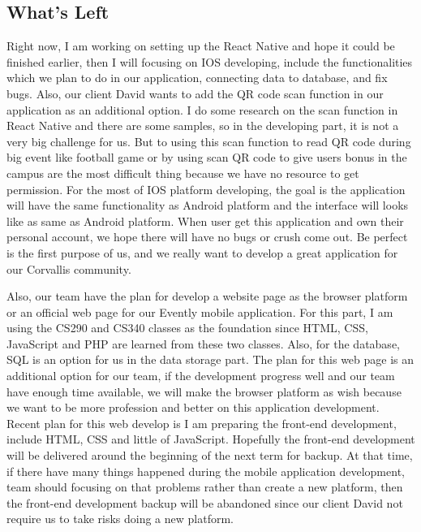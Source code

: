 \documentclass[letterpaper, 10pt,titlepage]{article}
\begin{document}
\subsection{What's Left}
Right now, I am working on setting up the React Native and hope it could be finished earlier, then I will focusing on IOS developing, include the functionalities which we plan to do in our application, connecting data to database, and fix bugs. Also, our client David wants to add the QR code scan function in our application as an additional option. I do some research on the scan function in React Native and there are some samples, so in the developing part, it is not a very big challenge for us. But to using this scan function to read QR code during big event like football game or by using scan QR code to give users bonus in the campus are the most difficult thing because we have no resource to get permission. For the most of IOS platform developing, the goal is the application will have the same functionality as Android platform and the interface will looks like as same as Android platform. When user get this application and own their personal account, we hope there will have no bugs or crush come out. Be perfect is the first purpose of us, and we really want to develop a great application for our Corvallis community.

Also, our team have the plan for develop a website page as the browser platform or an official web page for our Evently mobile application. For this part, I am using the CS290 and CS340 classes as the foundation since HTML, CSS, JavaScript and PHP are learned from these two classes. Also, for the database, SQL is an option for us in the data storage part. The plan for this web page is an additional option for our team, if the development progress well and our team have enough time available, we will make the browser platform as wish because we want to be more profession and better on this application development. Recent plan for this web develop is I am preparing the front-end development, include HTML, CSS and little of JavaScript. Hopefully the front-end development will be delivered around the beginning of the next term for backup. At that time, if there have many things happened during the mobile application development, team should focusing on that problems rather than create a new platform, then the front-end development backup will be abandoned since our client David not require us to take risks doing a new platform. 
\end{document}
